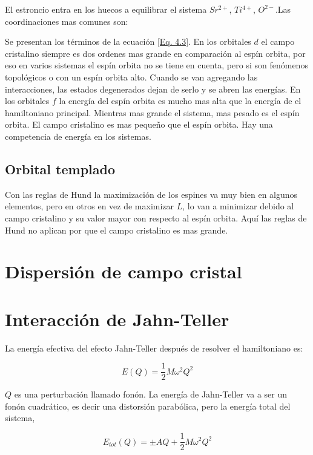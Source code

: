 \documentclass[11pt,fleqn]{book}
\begin{document}
El estroncio entra en los huecos a equilibrar el sistema $Sr^{2+}$, $Ti^{4+}$, $O^{2-}$.Las coordinaciones mas comunes son:



Se presentan los términos de la ecuación \ref{Eq. 4.3}. En los orbitales $d$ el campo cristalino siempre es dos ordenes mas grande en comparación al espín orbita, por eso en varios sistemas el espín orbita no se tiene en cuenta, pero si son fenómenos topológicos o con un espín orbita alto. Cuando se van agregando las interacciones, las estados degenerados dejan de serlo y se abren las energías. En los orbitales $f$ la energía del espín orbita es mucho mas alta que la energía de el hamiltoniano principal. Mientras mas grande el sistema, mas pesado es el espín orbita. El campo cristalino es mas pequeño que el espín orbita. Hay una competencia de energía en los sistemas. 

\subsection{Orbital templado}

Con las reglas de Hund la maximización de los espines va muy bien en algunos elementos, pero en otros en vez de maximizar $L$, lo van a minimizar debido al campo cristalino y su valor mayor con respecto al espín orbita. Aquí las reglas de Hund no aplican por que el campo cristalino es mas grande.

\section{Dispersión de campo cristal}

\section{Interacción de Jahn-Teller}

La energía efectiva del efecto Jahn-Teller después de resolver el hamiltoniano es:

\begin{equation}
    E(Q)=\frac{1}{2}M\omega^{2}Q^{2}
    \label{Eq. 4.4}
\end{equation}

$Q$ es una perturbación llamado fonón. La energía de Jahn-Teller va a ser un fonón cuadrático, es decir una distorsión parabólica, pero la energía total del sistema,

\begin{equation}
E_{tot}(Q)=\pm AQ+\frac{1}{2}M\omega^{2}Q^{2}    
\label{Eq. 4.5}
\end{equation}
\end{document}
